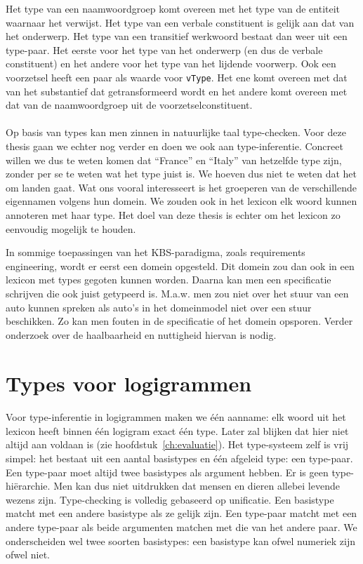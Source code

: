 Het type van een naamwoordgroep komt overeen met het type van de entiteit waarnaar het verwijst. Het type van een verbale constituent is gelijk aan dat van het onderwerp. Het type van een transitief werkwoord bestaat dan weer uit een type-paar. Het eerste voor het type van het onderwerp (en dus de verbale constituent) en het andere voor het type van het lijdende voorwerp. Ook een voorzetsel heeft een paar als waarde voor \texttt{vType}. Het ene komt overeen met dat van het substantief dat getransformeerd wordt en het andere komt overeen met dat van de naamwoordgroep uit de voorzetselconstituent.

\paragraph{} Op basis van types kan men zinnen in natuurlijke taal type-checken. Voor deze thesis gaan we echter nog verder en doen we ook aan type-inferentie. Concreet willen we dus te weten komen dat ``France'' en ``Italy'' van hetzelfde type zijn, zonder per se te weten wat het type juist is. We hoeven dus niet te weten dat het om landen gaat. Wat ons vooral interesseert is het groeperen van de verschillende eigennamen volgens hun domein. We zouden ook in het lexicon elk woord kunnen annoteren met haar type. Het doel van deze thesis is echter om het lexicon zo eenvoudig mogelijk te houden. 

In sommige toepassingen van het KBS-paradigma, zoals requirements engineering, wordt er eerst een domein opgesteld. Dit domein zou dan ook in een lexicon met types gegoten kunnen worden. Daarna kan men een specificatie schrijven die ook juist getypeerd is. M.a.w. men zou niet over het stuur van een auto kunnen spreken als auto's in het domeinmodel niet over een stuur beschikken. Zo kan men fouten in de specificatie of het domein opsporen. Verder onderzoek over de haalbaarheid en nuttigheid hiervan is nodig.

\section{Types voor logigrammen}
\paragraph{} Voor type-inferentie in logigrammen maken we één aanname: elk woord uit het lexicon heeft binnen één logigram exact één type. Later zal blijken dat hier niet altijd aan voldaan is (zie hoofdstuk~\ref{ch:evaluatie}). Het type-systeem zelf is vrij simpel: het bestaat uit een aantal basistypes en één afgeleid type: een type-paar. Een type-paar moet altijd twee basistypes als argument hebben. Er is geen type-hiërarchie. Men kan dus niet uitdrukken dat mensen en dieren allebei levende wezens zijn. Type-checking is volledig gebaseerd op unificatie. Een basistype matcht met een andere basistype als ze gelijk zijn. Een type-paar matcht met een andere type-paar als beide argumenten matchen met die van het andere paar. We onderscheiden wel twee soorten basistypes: een basistype kan ofwel numeriek zijn ofwel niet. 


